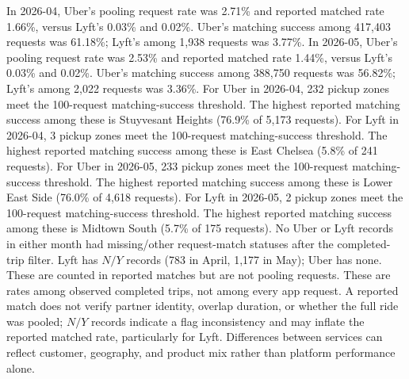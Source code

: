 In 2026-04, Uber's pooling request rate was 2.71\% and reported matched rate 1.66\%, versus Lyft's 0.03\% and 0.02\%. Uber's matching success among 417,403 requests was 61.18\%; Lyft's among 1,938 requests was 3.77\%.
In 2026-05, Uber's pooling request rate was 2.53\% and reported matched rate 1.44\%, versus Lyft's 0.03\% and 0.02\%. Uber's matching success among 388,750 requests was 56.82\%; Lyft's among 2,022 requests was 3.36\%.
For Uber in 2026-04, 232 pickup zones meet the 100-request matching-success threshold. The highest reported matching success among these is Stuyvesant Heights (76.9\% of 5,173 requests).
For Lyft in 2026-04, 3 pickup zones meet the 100-request matching-success threshold. The highest reported matching success among these is East Chelsea (5.8\% of 241 requests).
For Uber in 2026-05, 233 pickup zones meet the 100-request matching-success threshold. The highest reported matching success among these is Lower East Side (76.0\% of 4,618 requests).
For Lyft in 2026-05, 2 pickup zones meet the 100-request matching-success threshold. The highest reported matching success among these is Midtown South (5.7\% of 175 requests).
No Uber or Lyft records in either month had missing/other request-match statuses after the completed-trip filter. Lyft has $N/Y$ records (783 in April, 1,177 in May); Uber has none. These are counted in reported matches but are not pooling requests.
These are rates among observed completed trips, not among every app request. A reported match does not verify partner identity, overlap duration, or whether the full ride was pooled; $N/Y$ records indicate a flag inconsistency and may inflate the reported matched rate, particularly for Lyft. Differences between services can reflect customer, geography, and product mix rather than platform performance alone.
